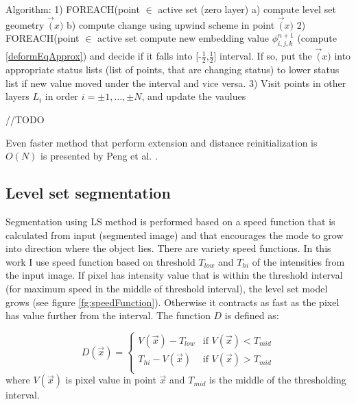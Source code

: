 Algorithm:
\label{alg:sparseFileld}
1) FOREACH(point $\in$ active set (zero layer)
  a) compute level set geometry $\vec(x)$
  b) compute change using upwind scheme in point $\vec(x)$
2) FOREACH(point $\in$ active set compute new embedding value
$\phi_{i,j,k}^{n+1}$ (compute \ref{deformEqApprox}) and decide if it falls into
[-$\frac{1}{2}$,$\frac{1}{2}$] interval. If so, put the $\vec(x)$ into
appropriate status lists (list of points, that are changing status) to lower
status list if new value moved under the interval and vice versa.
3) Visit points in other layers $L_i$ in order $i=\pm 1,\ldots, \pm N$, and
update the vaulues

//TODO

Even faster method that perform extension and distance reinitialization is $O(N)$ is presented by Peng et al. \cite{pengSparseFields}.

\subsection{Level set segmentation}

Segmentation using LS method is performed based on a speed function that is calculated from input (segmented image) and that encourages the mode to grow into direction where the object lies. There are variety speed functions. In this work I use speed function based on threshold $T_{low}$ and $T_{hi}$ of the intensities from the input image. If pixel has intensity value that is within the threshold interval (for maximum speed in the middle of threshold interval), the level set model grows (see figure \ref{fg:speedFunction}). Otherwise it contracts as fast as the pixel has value further from the interval. The function $D$ is defined as:

\begin{equation}
\label{eq:speedFunction}
D(\vec{x}) = 
\begin{cases}
V(\vec{x}) - T_{low} & \text{if $V(\vec{x}) < T_{mid}$}\\
T_{hi} - V(\vec{x}) & \text{if $V(\vec{x}) > T_{mid}$}\\
\end{cases}
\end{equation}
where $V(\vec{x})$ is pixel value in point $\vec{x}$ and $T_{mid}$ is the middle of the thresholding interval.


